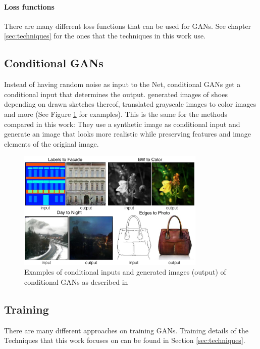 \paragraph{Loss functions} There are many different loss functions that can be used for GANs. See chapter \ref{sec:techniques} for the ones that the techniques in this work use.

\subsection{Conditional GANs}
Instead of having random noise as input to the Net, conditional GANs get a conditional input that determines the output. \cite{DBLP:journals/corr/IsolaZZE16} generated images of shoes depending on drawn sketches thereof, translated grayscale images to color images and more (See Figure \ref{fig:I2I_examples} for examples). This is the same for the methods compared in this work: They use a synthetic image as conditional input and generate an image that looks more realistic while preserving features and image elements of the original image.

\begin{figure}
	\centering
	\includegraphics[width=0.8\textwidth]{../images/I2I_examples.png}
	\caption{Examples of conditional inputs and generated images (output) of conditional GANs as described in \cite{DBLP:journals/corr/IsolaZZE16}}
	\label{fig:I2I_examples}
\end{figure}


\subsection{Training}
There are many different approaches on training GANs. Training details of the Techniques that this work focuses on can be found in Section \ref{sec:techniques}.


\newpage

